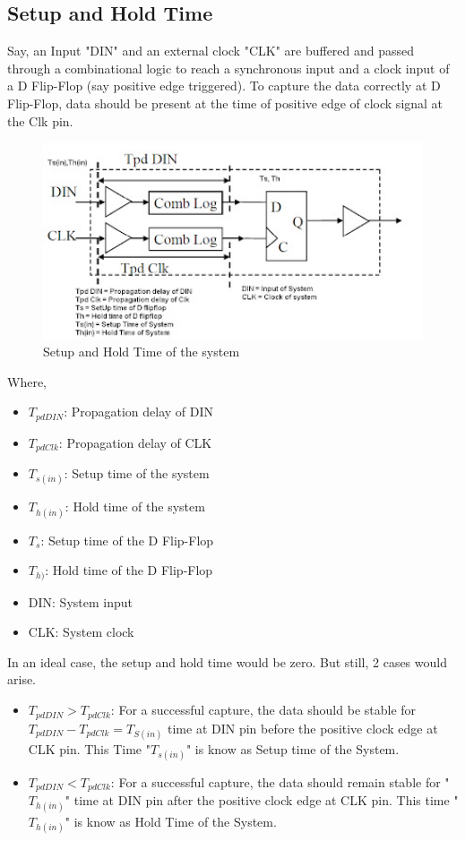 \fi

\subsection{Setup and Hold Time}
Say, an Input "DIN" and an external clock "CLK" are buffered and passed through a combinational logic to reach a synchronous input and a clock input of a D Flip-Flop (say positive edge triggered). To capture the data correctly at D Flip-Flop, data should be present at the time of positive edge of clock signal at the Clk pin.

\begin{figure}[H]
\begin{center}
\includegraphics[width=4.5in]{images/STASetupHold.jpg}
\caption{Setup and Hold Time of the system}
\label{STASetupHold}
\end{center}
\end{figure}

Where,
\begin{itemize}
    \item \(T_{pdDIN}\): Propagation delay of DIN
    \item \(T_{pdClk}\): Propagation delay of CLK
    \item \(T_{s(in)}\): Setup time of the system
    \item \(T_{h(in)}\): Hold time of the system
    \item \(T_{s}\): Setup time of the D Flip-Flop
    \item \(T_{h)}\): Hold time of the D Flip-Flop
    \item DIN: System input
    \item CLK: System clock
\end{itemize}

In an ideal case, the setup and hold time would be zero. But still, 2 cases would arise.
\begin{itemize}
    \item \(T_{pdDIN} > T_{pdClk}\): For a successful capture, the data should be stable for \(T_{pdDIN} - T_{pdClk} = T_{S(in)}\) time at DIN pin before the positive clock edge at CLK pin. This Time "\(T_{s(in)}\)" is know as Setup time of the System.
    \item  \(T_{pdDIN} < T_{pdClk}\): For a successful capture, the data should remain stable for "\(T_{h(in)}\)" time at DIN pin after the positive clock edge at CLK pin. This time "\(T_{h(in)}\)" is know as Hold Time of the System.
\end{itemize}

